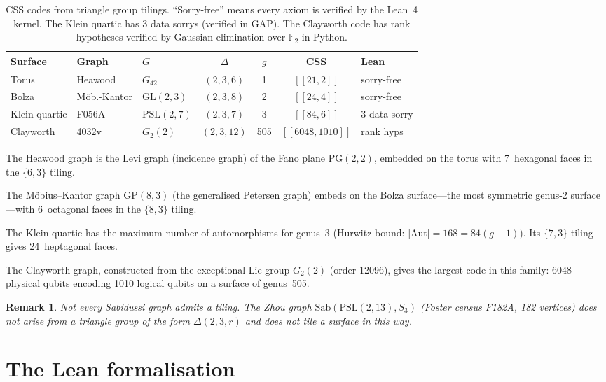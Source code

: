 \documentclass[11pt,a4paper]{article}
\newtheorem{remark}[theorem]{Remark}
\newcommand{\FF}{\mathbb{F}_2}
\begin{document}
\begin{table}[ht]
\centering\small
\begin{tabular}{@{}lllcccl@{}}
\toprule
Surface & Graph & $G$ & $\Delta$ & $g$ & CSS & Lean \\
\midrule
Torus & Heawood & $G_{42}$ & $(2,3,6)$ & 1 & $[\![21,2]\!]$ & sorry-free \\
Bolza & M\"ob.-Kantor & $\mathrm{GL}(2,3)$ & $(2,3,8)$ & 2 & $[\![24,4]\!]$ & sorry-free \\
Klein quartic & F056A & $\mathrm{PSL}(2,7)$ & $(2,3,7)$ & 3 & $[\![84,6]\!]$ & 3 data sorry \\
Clayworth & 4032v & $G_2(2)$ & $(2,3,12)$ & 505 & $[\![6048,1010]\!]$ & rank hyps \\
\bottomrule
\end{tabular}
\caption{CSS codes from triangle group tilings. ``Sorry-free'' means every
  axiom is verified by the Lean~4 kernel. The Klein quartic has 3 data
  sorrys (verified in GAP). The Clayworth code has rank hypotheses verified
  by Gaussian elimination over $\FF$ in Python.}
\label{tab:instances}
\end{table}

The Heawood graph is the Levi graph (incidence graph) of the Fano plane
$\mathrm{PG}(2,2)$, embedded on the torus with 7~hexagonal faces in the
$\{6,3\}$ tiling.

The M\"obius--Kantor graph $\mathrm{GP}(8,3)$ (the generalised Petersen
graph) embeds on the Bolza surface---the most symmetric genus-2
surface---with 6~octagonal faces in the $\{8,3\}$ tiling.

The Klein quartic has the maximum number of automorphisms for genus~3
(Hurwitz bound: $|\mathrm{Aut}| = 168 = 84(g-1)$). Its $\{7,3\}$ tiling
gives 24~heptagonal faces.

The Clayworth graph, constructed from the exceptional Lie group $G_2(2)$
(order 12096), gives the largest code in this family: 6048 physical qubits
encoding 1010 logical qubits on a surface of genus~505.

\begin{remark}
Not every Sabidussi graph admits a tiling. The Zhou graph
$\mathrm{Sab}(\mathrm{PSL}(2,13), S_3)$ (Foster census F182A, 182
vertices) does not arise from a triangle group of the form $\Delta(2,3,r)$
and does not tile a surface in this way.
\end{remark}


\section{The Lean formalisation}\label{sec:lean}
\end{document}
